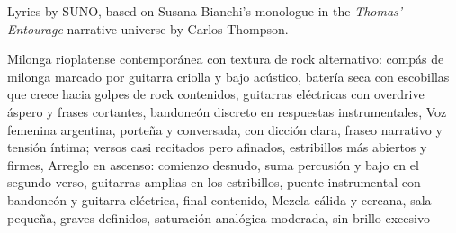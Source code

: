 
\begin{notes}
Lyrics by SUNO, based on Susana Bianchi's monologue in the \emph{Thomas’ Entourage} narrative universe by Carlos Thompson.
\end{notes}
\begin{style}
Milonga rioplatense contemporánea con textura de rock alternativo: compás de milonga marcado por guitarra criolla y bajo acústico, batería seca con escobillas que crece hacia golpes de rock contenidos, guitarras eléctricas con overdrive áspero y frases cortantes, bandoneón discreto en respuestas instrumentales, Voz femenina argentina, porteña y conversada, con dicción clara, fraseo narrativo y tensión íntima; versos casi recitados pero afinados, estribillos más abiertos y firmes, Arreglo en ascenso: comienzo desnudo, suma percusión y bajo en el segundo verso, guitarras amplias en los estribillos, puente instrumental con bandoneón y guitarra eléctrica, final contenido, Mezcla cálida y cercana, sala pequeña, graves definidos, saturación analógica moderada, sin brillo excesivo
\end{style}
